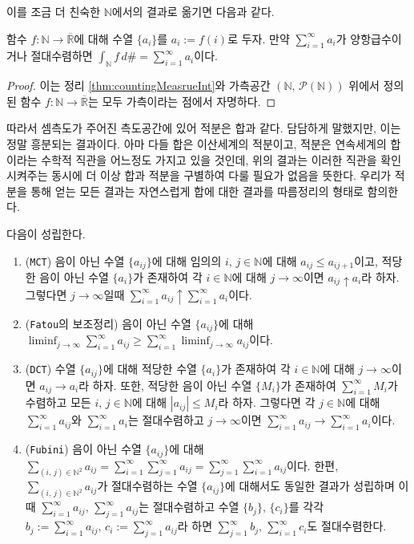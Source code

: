이를 조금 더 친숙한 $\mathbb{N}$에서의 결과로 옮기면 다음과 같다.

\begin{corollary}
    함수 $f:\mathbb{N}\to\overline{\mathbb{R}}$에 대해 수열 $\{a_i\}$를 $a_i:=f(i)$로 두자. 만약 $\sum_{i=1}^\infty a_i$가 양항급수이거나 절대수렴하면 $\int_\mathbb{N}f\,d\#=\sum_{i=1}^\infty a_i$이다.
\end{corollary}

\begin{proof}
    이는 정리 \ref{thm:countingMeasrueInt}와 가측공간 $(\mathbb{N},\,\mathcal{P}(\mathbb{N}))$ 위에서 정의된 함수 $f:\mathbb{N}\to\overline{\mathbb{R}}$는 모두 가측이라는 점에서 자명하다.
\end{proof}

따라서 셈측도가 주어진 측도공간에 있어 적분은 합과 같다. 담담하게 말했지만, 이는 정말 흥분되는 결과이다. 아마 다들 합은 이산세계의 적분이고, 적분은 연속세계의 합이라는 수학적 직관을 어느정도 가지고 있을 것인데, 위의 결과는 이러한 직관을 확인시켜주는 동시에 더 이상 합과 적분을 구별하여 다룰 필요가 없음을 뜻한다. 우리가 적분을 통해 얻는 모든 결과는 자연스럽게 합에 대한 결과를 따름정리의 형태로 함의한다.

\begin{corollary}
    다음이 성립한다.
    \begin{enumerate}
        \item (\texttt{MCT}) 음이 아닌 수열 $\{a_{ij}\}$에 대해 임의의 $i,\,j\in\mathbb{N}$에 대해 $a_{ij}\leq a_{ij+1}$이고, 적당한 음이 아닌 수열 $\{a_i\}$가 존재하여 각 $i\in\mathbb{N}$에 대해 $j\to\infty$이면 $a_{ij}\uparrow a_i$라 하자. 그렇다면 $j\to\infty$일때 $\sum_{i=1}^\infty a_{ij}\uparrow\sum_{i=1}^\infty a_i$이다.
        \item (\texttt{Fatou}의 보조정리) 음이 아닌 수열 $\{a_{ij}\}$에 대해 $\liminf_{j\to\infty}\sum_{i=1}^\infty a_{ij}\geq\sum_{i=1}^\infty\liminf_{j\to\infty}a_{ij}$이다.
        \item (\texttt{DCT}) 수열 $\{a_{ij}\}$에 대해 적당한 수열 $\{a_i\}$가 존재하여 각 $i\in\mathbb{N}$에 대해 $j\to\infty$이면 $a_{ij}\to a_i$라 하자. 또한, 적당한 음이 아닌 수열 $\{M_i\}$가 존재하여 $\sum_{i=1}^\infty M_i$가 수렴하고 모든 $i,\,j\in\mathbb{N}$에 대해 $|a_{ij}|\leq M_i$라 하자. 그렇다면 각 $j\in\mathbb{N}$에 대해 $\sum_{i=1}^\infty a_{ij}$와 $\sum_{i=1}^\infty a_i$는 절대수렴하고 $j\to\infty$이면 $\sum_{i=1}^\infty a_{ij}\to\sum_{i=1}^\infty a_i$이다.
        \item (\texttt{Fubini}) 음이 아닌 수열 $\{a_{ij}\}$에 대해 $\sum_{(i,\,j)\in\mathbb{N}^2}a_{ij}=\sum_{i=1}^\infty\sum_{j=1}^\infty a_{ij}=\sum_{j=1}^\infty\sum_{i=1}^\infty a_{ij}$이다. 한편, $\sum_{(i,\,j)\in\mathbb{N}^2}a_{ij}$가 절대수렴하는 수열 $\{a_{ij}\}$에 대해서도 동일한 결과가 성립하며 이때 $\sum_{i=1}^\infty a_{ij},\,\sum_{j=1}^\infty a_{ij}$는 절대수렴하고 수열 $\{b_j\},\,\{c_i\}$를 각각 $b_j:=\sum_{i=1}^\infty a_{ij},\,c_i:=\sum_{j=1}^\infty a_{ij}$라 하면 $\sum_{j=1}^\infty b_j,\,\sum_{i=1}^\infty c_i$도 절대수렴한다.
    \end{enumerate}
\end{corollary}

